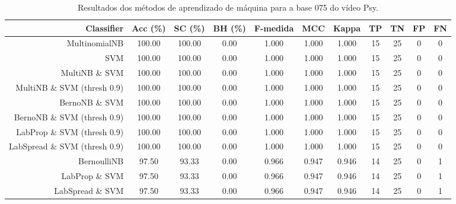 \begin{table}[!htb]
\centering
\caption{Resultados dos métodos de aprendizado de máquina para a base 075 do vídeo Psy.}
\label{tab:Psy-075}
\begin{tabular}{r|c|c|c|c|c|c|c|c|c|c}
\hline\hline
Classifier & Acc (\%) & SC (\%) & BH (\%) & F-medida & MCC & Kappa & TP & TN & FP & FN \\ \hline
MultinomialNB & 100.00 & 100.00 & 0.00 & 1.000 & 1.000 & 1.000 & 15 & 25 & 0 & 0 \\ 
SVM & 100.00 & 100.00 & 0.00 & 1.000 & 1.000 & 1.000 & 15 & 25 & 0 & 0 \\ 
MultiNB \& SVM & 100.00 & 100.00 & 0.00 & 1.000 & 1.000 & 1.000 & 15 & 25 & 0 & 0 \\ 
MultiNB \& SVM (thresh 0.9) & 100.00 & 100.00 & 0.00 & 1.000 & 1.000 & 1.000 & 15 & 25 & 0 & 0 \\ 
BernoNB \& SVM & 100.00 & 100.00 & 0.00 & 1.000 & 1.000 & 1.000 & 15 & 25 & 0 & 0 \\ 
BernoNB \& SVM (thresh 0.9) & 100.00 & 100.00 & 0.00 & 1.000 & 1.000 & 1.000 & 15 & 25 & 0 & 0 \\ 
LabProp \& SVM (thresh 0.9) & 100.00 & 100.00 & 0.00 & 1.000 & 1.000 & 1.000 & 15 & 25 & 0 & 0 \\ 
LabSpread \& SVM (thresh 0.9) & 100.00 & 100.00 & 0.00 & 1.000 & 1.000 & 1.000 & 15 & 25 & 0 & 0 \\ 
BernoulliNB & 97.50 & 93.33 & 0.00 & 0.966 & 0.947 & 0.946 & 14 & 25 & 0 & 1 \\ 
LabProp \& SVM & 97.50 & 93.33 & 0.00 & 0.966 & 0.947 & 0.946 & 14 & 25 & 0 & 1 \\ 
LabSpread \& SVM & 97.50 & 93.33 & 0.00 & 0.966 & 0.947 & 0.946 & 14 & 25 & 0 & 1 \\ 
\hline\hline
\end{tabular}
\end{table}
